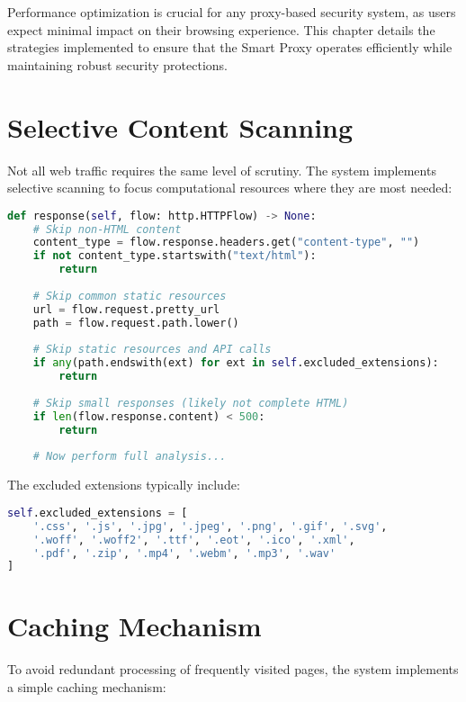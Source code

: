 Performance optimization is crucial for any proxy-based security system, as users expect minimal impact on their browsing experience. This chapter details the strategies implemented to ensure that the Smart Proxy operates efficiently while maintaining robust security protections.

\section{Selective Content Scanning}

Not all web traffic requires the same level of scrutiny. The system implements selective scanning to focus computational resources where they are most needed:

\begin{lstlisting}[language=Python, caption=Selective Content Scanning]
def response(self, flow: http.HTTPFlow) -> None:
    # Skip non-HTML content
    content_type = flow.response.headers.get("content-type", "")
    if not content_type.startswith("text/html"):
        return
        
    # Skip common static resources
    url = flow.request.pretty_url
    path = flow.request.path.lower()
    
    # Skip static resources and API calls
    if any(path.endswith(ext) for ext in self.excluded_extensions):
        return
        
    # Skip small responses (likely not complete HTML)
    if len(flow.response.content) < 500:
        return
        
    # Now perform full analysis...
\end{lstlisting}

The excluded extensions typically include:

\begin{lstlisting}[language=Python]
self.excluded_extensions = [
    '.css', '.js', '.jpg', '.jpeg', '.png', '.gif', '.svg',
    '.woff', '.woff2', '.ttf', '.eot', '.ico', '.xml', 
    '.pdf', '.zip', '.mp4', '.webm', '.mp3', '.wav'
]
\end{lstlisting}

\section{Caching Mechanism}

To avoid redundant processing of frequently visited pages, the system implements a simple caching mechanism:

